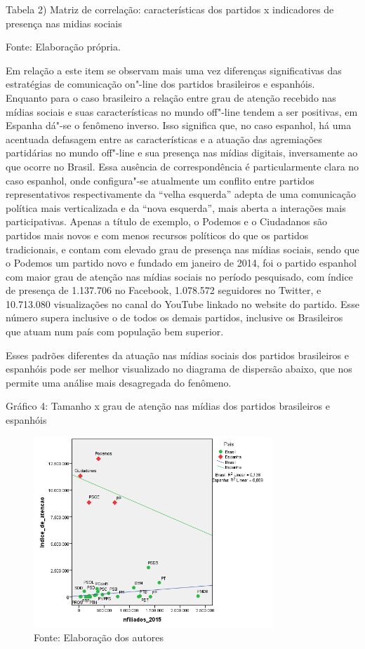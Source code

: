 Tabela 2) Matriz de correlação: características dos partidos x
indicadores de presença nas midias sociais

Fonte: Elaboração própria.

Em relação a este item se observam mais uma vez diferenças
significativas das estratégias de comunicação on"-line dos partidos
brasileiros e espanhóis. Enquanto para o caso brasileiro a relação entre
grau de atenção recebido nas mídias sociais e suas características no
mundo off"-line tendem a ser positivas, em Espanha dá"-se o fenômeno
inverso. Isso significa que, no caso espanhol, há uma acentuada
defasagem entre as características e a atuação das agremiações
partidárias no mundo off"-line e sua presença nas mídias digitais,
inversamente ao que ocorre no Brasil. Essa ausência de correspondência é
particularmente clara no caso espanhol, onde configura"-se atualmente um
conflito entre partidos representativos respectivamente da ``velha
esquerda'' adepta de uma comunicação política mais verticalizada e da
``nova esquerda'', mais aberta a interações mais participativas. Apenas
a título de exemplo, o Podemos e o Ciudadanos são partidos mais novos e
com menos recursos políticos do que os partidos tradicionais, e contam
com elevado grau de presença nas mídias sociais, sendo que o Podemos um
partido novo e fundado em janeiro de 2014, foi o partido espanhol com
maior grau de atenção nas mídias sociais no período pesquisado, com
índice de presença de 1.137.706 no Facebook, 1.078.572 seguidores no
Twitter, e 10.713.080 visualizações no canal do YouTube linkado no
website do partido. Esse número supera inclusive o de todos os demais
partidos, inclusive os Brasileiros que atuam num país com população bem
superior.

Esses padrões diferentes da atuação nas mídias sociais dos partidos
brasileiros e espanhóis pode ser melhor visualizado no diagrama de
dispersão abaixo, que nos permite uma análise mais desagregada do
fenômeno.

Gráfico 4: Tamanho x grau de atenção nas mídias dos partidos brasileiros
e espanhóis

\begin{figure}[!ht]
\centering
 \includegraphics[width=90mm]{./imgs/graf4.png}
\caption{Fonte: Elaboração dos autores}
\end{figure}

